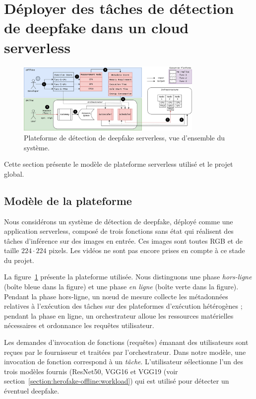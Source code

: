 \section{Déployer des tâches de détection de deepfake dans un cloud serverless}
\label{section:herofake-deepfake}

\begin{figure}[t]
\centering
\includegraphics[width=0.8\textwidth]{4_Chapitre4/figures/placement.png}
\caption{Plateforme de détection de deepfake serverless, vue d'ensemble du système.}
\label{figure:herofake-placement}
\end{figure}

Cette section présente le modèle de plateforme serverless utilisé et le projet global.

\subsection{Modèle de la plateforme}

Nous considérons un système de détection de deepfake, déployé comme une application serverless, composé de trois fonctions sans état qui réalisent des tâches d'inférence sur des images en entrée. Ces images sont toutes RGB et de taille $224 \cdot 224$ pixels. Les vidéos ne sont pas encore prises en compte à ce stade du projet.

La figure~\ref{figure:herofake-placement} présente la plateforme utilisée. Nous distinguons une phase \textit{hors-ligne} (boîte bleue dans la figure) et une phase \textit{en ligne} (boîte verte dans la figure). Pendant la phase hors-ligne, un nœud de mesure collecte les métadonnées relatives à l'exécution des tâches sur des plateformes d'exécution hétérogènes ; pendant la phase en ligne, un orchestrateur alloue les ressources matérielles nécessaires et ordonnance les requêtes utilisateur.

Les demandes d'invocation de fonctions (requêtes) émanant des utilisateurs sont reçues par le fournisseur et traitées par l'orchestrateur. Dans notre modèle, une invocation de fonction correspond à un \textit{tâche}. L'utilisateur sélectionne l'un des trois modèles fournis (ResNet50, VGG16 et VGG19 (voir section~\ref{section:herofake-offline:workload}) qui est utilisé pour détecter un éventuel deepfake.

